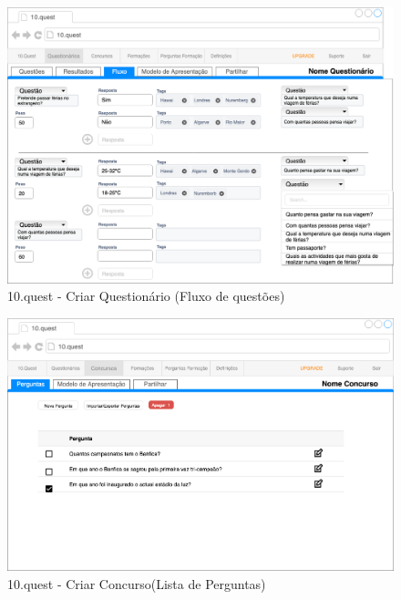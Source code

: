 \begin{figure}[ht!]
	\begin{center}
		\includegraphics[width=1\textwidth]{img/prototipos/17.png}
		\caption{10.quest - Criar Questionário (Fluxo de questões)}
		\label{10q-}
	\end{center}
\end{figure}

\begin{figure}[ht!]
	\begin{center}
		\includegraphics[width=1\textwidth]{img/prototipos/18.png}
		\caption{10.quest - Criar Concurso(Lista de Perguntas)}
		\label{10q-}
	\end{center}
\end{figure}



